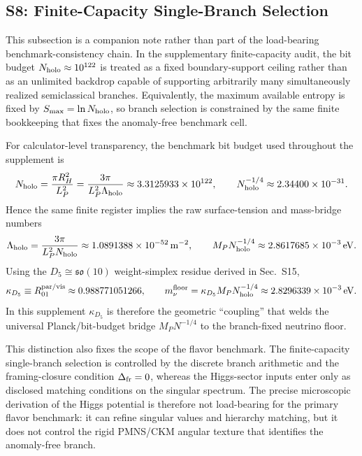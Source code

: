 \documentclass[11pt]{article}
\begin{document}
\subsection*{S8: Finite-Capacity Single-Branch Selection}

This subsection is a companion note rather than part of the load-bearing
benchmark-consistency chain. In the supplementary finite-capacity audit, the
bit budget $N_{\rm holo}\approx10^{122}$ is treated as a fixed
boundary-support ceiling rather than as an unlimited backdrop capable of
supporting arbitrarily many simultaneously realized semiclassical branches.
Equivalently, the maximum available entropy is fixed by
$S_{\max}=\ln N_{\rm holo}$, so branch selection is constrained by the same
finite bookkeeping that fixes the anomaly-free benchmark cell.

For calculator-level transparency, the benchmark bit budget used throughout the
supplement is
\begin{equation}
 N_{\rm holo}
 =
 \frac{\pi R_H^2}{L_P^2}
 =
 \frac{3\pi}{L_P^2\Lambda_{\rm holo}}
 \approx 3.3125933\times10^{122},
 \qquad
 N_{\rm holo}^{-1/4}\approx 2.34400\times10^{-31}.
\end{equation}
Hence the same finite register implies the raw surface-tension and mass-bridge
numbers
\begin{equation}
 \Lambda_{\rm holo}
 =
 \frac{3\pi}{L_P^2N_{\rm holo}}
 \approx 1.0891388\times10^{-52}\,\mathrm{m}^{-2},
 \qquad
 M_PN_{\rm holo}^{-1/4}
 \approx 2.8617685\times10^{-3}\,\mathrm{eV}.
\end{equation}
Using the $D_5\cong\mathfrak{so}(10)$ weight-simplex residue derived in
Sec.~S15,
\begin{equation}
 \kappa_{D_5}
 \equiv
 R_{01}^{\rm par/vis}
 \approx 0.988771051266,
 \qquad
 m_{\nu}^{\rm floor}
 =
 \kappa_{D_5}M_PN_{\rm holo}^{-1/4}
 \approx 2.8296339\times10^{-3}\,\mathrm{eV}.
\end{equation}
In this supplement $\kappa_{D_5}$ is therefore the geometric ``coupling'' that
welds the universal Planck/bit-budget bridge $M_PN^{-1/4}$ to the branch-fixed
neutrino floor.

This distinction also fixes the scope of the flavor benchmark. The
finite-capacity single-branch selection is controlled by the discrete branch
arithmetic and the framing-closure condition $\Delta_{\rm fr}=0$, whereas the
Higgs-sector inputs enter only as disclosed matching conditions on the singular
spectrum. The precise microscopic derivation of the Higgs potential is
therefore not load-bearing for the primary flavor benchmark: it can refine
singular values and hierarchy matching, but it does not control the rigid
PMNS/CKM angular texture that identifies the anomaly-free branch.
\end{document}
